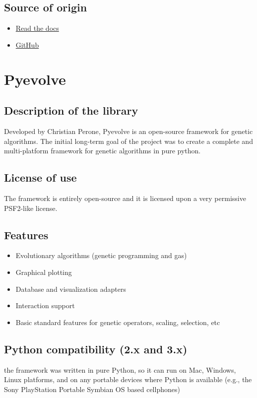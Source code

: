 \documentclass{article}
\begin{document}
	\subsection{Source of origin}
	\begin{itemize}
		\item \href{https://gaft.readthedocs.io/en/latest/api/index.html}{Read the docs}
		\item \href{https://github.com/PytLab/gaft}{GitHub}
	\end{itemize}
	
	\section{Pyevolve}
	\subsection{Description of the library}
	Developed by Christian Perone, Pyevolve is an open-source framework for genetic algorithms. The initial long-term goal of the project was to create a complete and multi-platform framework for genetic algorithms in pure python.
	\subsection{License of use}
	The framework is entirely open-source and it is licensed upon a very permissive PSF2-like license.
	\subsection{Features}
	\begin{itemize}
		\item Evolutionary algorithms (genetic programming  and gas)
		\item Graphical plotting
		\item Database and visualization adapters
		\item Interaction support
		\item Basic standard features for genetic operators, scaling, selection, etc
	\end{itemize}
	\subsection{Python compatibility (2.x and 3.x)}
	the framework was written in pure Python, so it can run on Mac, Windows, Linux platforms, and on any portable devices where Python is available (e.g., the Sony PlayStation Portable Symbian OS based cellphones)
\end{document}
